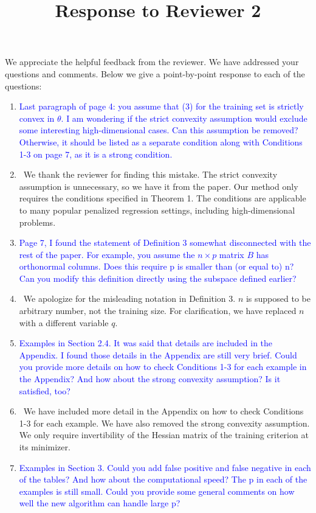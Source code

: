 \documentclass[]{article}
\title{Response to Reviewer 2}
\newcommand{\point}[1]{\item \textcolor{blue}{#1}}
\newcommand{\reply}{\item[]\ }
\begin{document}
	\maketitle
		
	We appreciate the helpful feedback from the reviewer. We have addressed your questions and comments. Below we give a point-by-point response to each of the questions:
		
	\begin{enumerate}
		\point{Last paragraph of page 4: you assume that (3) for the training set is strictly convex in $\theta$. I am wondering if the strict convexity assumption would exclude some interesting high-dimensional cases. Can this assumption be removed? Otherwise, it should be listed as a separate condition along with Conditions 1-3 on page 7, as it is a strong condition.}
		
		\reply We thank the reviewer for finding this mistake. The strict convexity assumption is unnecessary, so we have it from the paper. Our method only requires the conditions specified in Theorem 1. The conditions are applicable to many popular penalized regression settings, including high-dimensional problems.
		
		\point{Page 7, I found the statement of Definition 3 somewhat disconnected with the rest of the paper. For example, you assume the $n\times p$ matrix $B$ has orthonormal columns. Does this require p is smaller than (or equal to) n? Can you modify this definition directly using the subspace defined earlier?}
		
		\reply We apologize for the misleading notation in Definition 3. $n$ is supposed to be arbitrary number, not the training size. For clarification, we have replaced $n$ with a different variable $q$. 
		
		
		\point{Examples in Section 2.4. It was said that details are included in the Appendix. I found those details in the Appendix are still very brief. Could you provide more details on how to check Conditions 1-3 for each example in the Appendix? And how about the strong convexity assumption? Is it satisfied, too?}
		
		\reply We have included more detail in the Appendix on how to check Conditions 1-3 for each example. We have also removed the strong convexity assumption. We only require invertibility of the Hessian matrix of the training criterion at its minimizer.
		
		\point{Examples in Section 3. Could you add false positive and false negative in each of the tables? And how about the computational speed? The p in each of the examples is still small. Could you provide some general comments on how well the new algorithm can handle large p?}
		

\end{enumerate}
\end{document}
